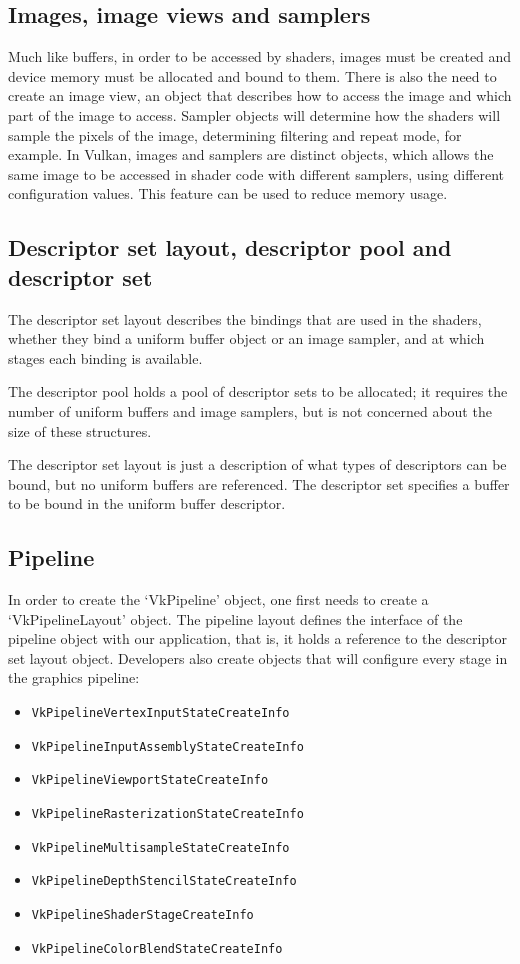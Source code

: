 \subsection{Images, image views and samplers}
Much like buffers, in order to be accessed by shaders, images must be created and device memory must be allocated and bound to them. There is also the need to create an image view, an object that describes how to access the image and which part of the image to access. Sampler objects will determine how the shaders will sample the pixels of the image, determining filtering and repeat mode, for example. In Vulkan, images and samplers are distinct objects, which allows the same image to be accessed in shader code with different samplers, using different configuration values. This feature can be used to reduce memory usage.

\subsection{Descriptor set layout, descriptor pool and descriptor set}
The descriptor set layout describes the bindings that are used in the shaders, whether they bind a uniform buffer object or an image sampler, and at which stages each binding is available.

The descriptor pool holds a pool of descriptor sets to be allocated; it requires the number of uniform buffers and image samplers, but is not concerned about the size of these structures.

The descriptor set layout is just a description of what types of descriptors can be bound, but no uniform buffers are referenced. The descriptor set specifies a buffer to be bound in the uniform buffer descriptor.

\subsection{Pipeline}
In order to create the `VkPipeline' object, one first needs to create a `VkPipelineLayout' object. The pipeline layout defines the interface of the pipeline object with our application, that is, it holds a reference to the descriptor set layout object. Developers also create objects that will configure every stage in the graphics pipeline:

\begin{itemize}
    \item \texttt{VkPipelineVertexInputStateCreateInfo}
    \item \texttt{VkPipelineInputAssemblyStateCreateInfo}
    \item \texttt{VkPipelineViewportStateCreateInfo}
    \item \texttt{VkPipelineRasterizationStateCreateInfo}
    \item \texttt{VkPipelineMultisampleStateCreateInfo}
    \item \texttt{VkPipelineDepthStencilStateCreateInfo}
    \item \texttt{VkPipelineShaderStageCreateInfo}
    \item \texttt{VkPipelineColorBlendStateCreateInfo}
\end{itemize}

